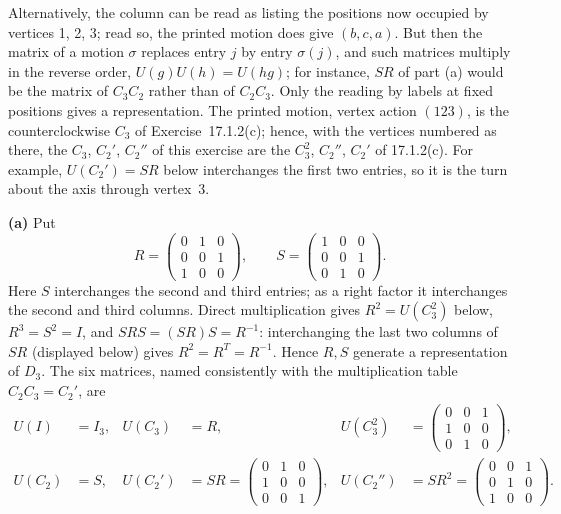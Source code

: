 Alternatively, the column can be read as listing the positions now
occupied by vertices 1, 2, 3; read so, the printed motion does give
$(b,c,a)$. But then the matrix of a motion $\sigma$ replaces entry
$j$ by entry $\sigma(j)$, and such matrices multiply in the reverse
order, $U(g)U(h)=U(hg)$; for
instance, $SR$ of part (a) would be the matrix of $C_3C_2$ rather than
of $C_2C_3$. Only the reading by labels at fixed positions gives a
representation.
The printed motion, vertex action $(123)$, is the counterclockwise
$C_3$ of Exercise~17.1.2(c); hence, with the vertices numbered as
there, the $C_3$, $C_2'$, $C_2''$ of this exercise are the $C_3^2$,
$C_2''$, $C_2'$ of 17.1.2(c). For example, $U(C_2')=SR$ below
interchanges the first two entries, so it is the turn about the axis
through vertex~3.

\textbf{(a)} Put
\[
R=\begin{pmatrix}0&1&0\\0&0&1\\1&0&0\end{pmatrix},\qquad
S=\begin{pmatrix}1&0&0\\0&0&1\\0&1&0\end{pmatrix}.
\]
Here $S$ interchanges the second and third entries; as a right
factor it interchanges the second and third columns.
Direct multiplication gives $R^2=U(C_3^2)$ below, $R^3=S^2=I$,
and $SRS=(SR)S=R^{-1}$: interchanging the last two columns of $SR$
(displayed below) gives $R^2=R^T=R^{-1}$.
Hence $R,S$ generate a representation of $D_3$.
The six matrices, named consistently with the multiplication
table $C_2C_3=C_2'$, are
\[
\begin{aligned}
U(I)&=I_3,&
U(C_3)&=R,&
U(C_3^2)&=\begin{pmatrix}0&0&1\\1&0&0\\0&1&0\end{pmatrix},\\
U(C_2)&=S,&
U(C_2')&=SR=\begin{pmatrix}0&1&0\\1&0&0\\0&0&1\end{pmatrix},&
U(C_2'')&=SR^2=\begin{pmatrix}0&0&1\\0&1&0\\1&0&0\end{pmatrix}.
\end{aligned}
\]

